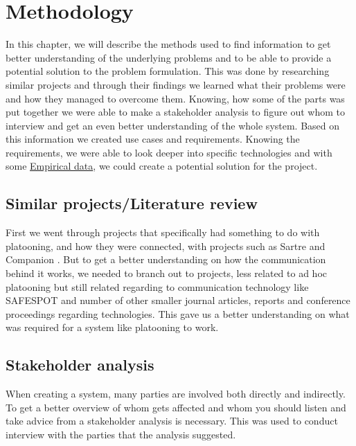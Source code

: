 \section{Methodology}\label{sec:methodology}
% 
In this chapter, we will describe the methods used to find information to get better understanding of the underlying problems and to be able to provide a potential solution to the problem formulation. This was done by researching similar projects and through their findings we learned what their problems were and how they managed to overcome them. Knowing, how some of the parts was put together we were able to make a stakeholder analysis to figure out whom to interview and get an even better understanding of the whole system. Based on this information we created use cases and requirements. Knowing the requirements, we were able to look deeper into specific technologies and with some \hyperref[sec:data]{Empirical data}, we could create a potential solution for the project. 
% 
\subsection{Similar projects/Literature review}
First we went through projects that specifically had something to do with platooning, and how they were connected, with projects such as Sartre \cite{Chan2012ProjectSARTRE} and Companion \cite{2016CompanionProject}. But to get a better understanding on how the communication behind it works, we needed to branch out to projects, less related to ad hoc platooning but still related regarding to communication technology like SAFESPOT \cite{Safespot} and number of other smaller journal articles, reports and conference proceedings regarding technologies. This gave us a better understanding on what was required for a system like platooning to work.
% 
\subsection{Stakeholder analysis}
When creating a system, many parties are involved both directly and indirectly. To get a better overview of whom gets affected and whom you should listen and take advice from a stakeholder analysis is necessary. This was used to conduct interview with the parties that the analysis suggested. 
% 
